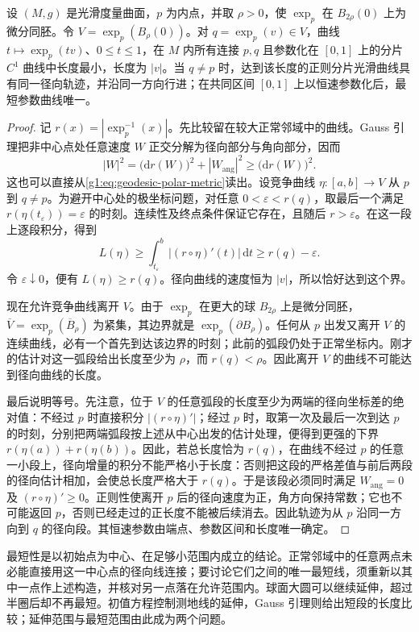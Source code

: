 \begin{theorem}
	\label{g1:thm:radial-minimizing}
	设 \((M,g)\) 是光滑度量曲面，\(p\) 为内点，并取 \(\rho>0\)，使 \(\exp_p\) 在 \(B_{2\rho}(0)\) 上为微分同胚。令 \(V=\exp_p(B_\rho(0))\)。对 \(q=\exp_p(v)\in V\)，曲线 \(t\mapsto\exp_p(tv)\)、\(0\le t\le1\)，在 \(M\) 内所有连接 \(p,q\) 且参数化在 \([0,1]\) 上的分片 \(C^1\) 曲线中长度最小，长度为 \(|v|\)。当 \(q\ne p\) 时，达到该长度的正则分片光滑曲线具有同一径向轨迹，并沿同一方向行进；在共同区间 \([0,1]\) 上以恒速参数化后，最短参数曲线唯一。
\end{theorem}
\begin{proof}
	记 \(r(x)=|\exp_p^{-1}(x)|\)。先比较留在较大正常邻域中的曲线。Gauss 引理把非中心点处任意速度 \(W\) 正交分解为径向部分与角向部分，因而
	\[
		|W|^2=\bigl(\mathrm{d}r(W)\bigr)^2+|W_{\mathrm{ang}}|^2
		\ge\bigl(\mathrm{d}r(W)\bigr)^2.
	\]
	这也可以直接从\eqref{g1:eq:geodesic-polar-metric}读出。设竞争曲线 \(\eta:[a,b]\to V\) 从 \(p\) 到 \(q\ne p\)。为避开中心处的极坐标问题，对任意 \(0<\varepsilon<r(q)\)，取最后一个满足 \(r(\eta(t_\varepsilon))=\varepsilon\) 的时刻。连续性及终点条件保证它存在，且随后 \(r>\varepsilon\)。在这一段上逐段积分，得到
	\[
		L(\eta)\ge\int_{t_\varepsilon}^b|(r\circ\eta)'(t)|\,\mathrm{d}t
		\ge r(q)-\varepsilon.
	\]
	令 \(\varepsilon\downarrow0\)，便有 \(L(\eta)\ge r(q)\)。径向曲线的速度恒为 \(|v|\)，所以恰好达到这个界。

	现在允许竞争曲线离开 \(V\)。由于 \(\exp_p\) 在更大的球 \(B_{2\rho}\) 上是微分同胚，\(\overline V=\exp_p(\overline B_\rho)\) 为紧集，其边界就是 \(\exp_p(\partial B_\rho)\)。任何从 \(p\) 出发又离开 \(V\) 的连续曲线，必有一个首先到达该边界的时刻；此前的弧段仍处于正常坐标内。刚才的估计对这一弧段给出长度至少为 \(\rho\)，而 \(r(q)<\rho\)。因此离开 \(V\) 的曲线不可能达到径向曲线的长度。

	最后说明等号。先注意，位于 \(V\) 的任意弧段的长度至少为两端的径向坐标差的绝对值：不经过 \(p\) 时直接积分 \(|(r\circ\eta)'|\)；经过 \(p\) 时，取第一次及最后一次到达 \(p\) 的时刻，分别把两端弧段按上述从中心出发的估计处理，便得到更强的下界 \(r(\eta(a))+r(\eta(b))\)。因此，若总长度恰为 \(r(q)\)，在曲线不经过 \(p\) 的任意一小段上，径向增量的积分不能严格小于长度：否则把这段的严格差值与前后两段的径向估计相加，会使总长度严格大于 \(r(q)\)。于是该段必须同时满足 \(W_{\mathrm{ang}}=0\) 及 \((r\circ\eta)'\ge0\)。正则性使离开 \(p\) 后的径向速度为正，角方向保持常数；它也不可能返回 \(p\)，否则已经走过的正长度不能被后续消去。因此轨迹为从 \(p\) 沿同一方向到 \(q\) 的径向段。其恒速参数由端点、参数区间和长度唯一确定。
\end{proof}

最短性是以初始点为中心、在足够小范围内成立的结论。正常邻域中的任意两点未必能直接用这一中心点的径向线连接；要讨论它们之间的唯一最短线，须重新以其中一点作上述构造，并核对另一点落在允许范围内。球面大圆可以继续延伸，超过半圈后却不再最短。初值方程控制测地线的延伸，Gauss 引理则给出短段的长度比较；延伸范围与最短范围由此成为两个问题。
